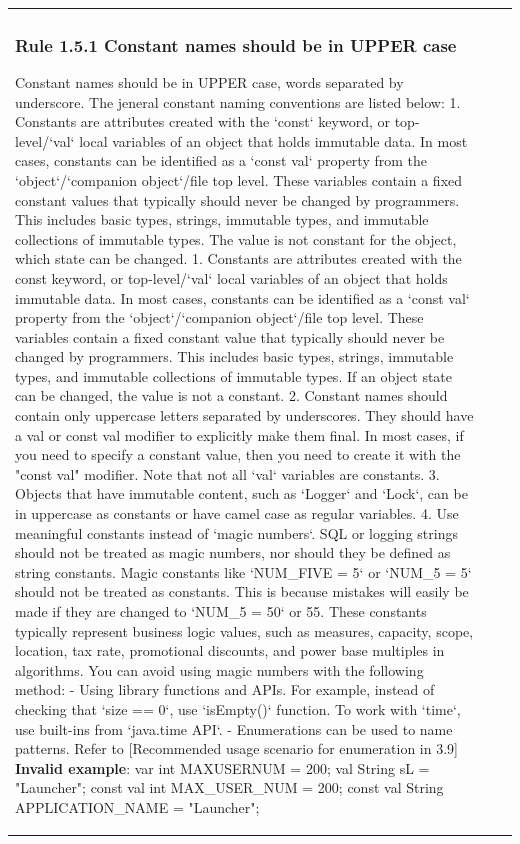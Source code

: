 \begin{center}
\begin{tabular}{ |p{}|p{}|p{}| }
\subsubsection*{\textbf{Rule 1.5.1 Constant names should be in UPPER case}}
Constant names should be in UPPER case, words separated by underscore. The jeneral constant naming conventions are listed below:
1. Constants are attributes created with the `const` keyword, or top-level/`val` local variables of an object that holds immutable data. In most cases, constants can be identified as a `const val` property from the `object`/`companion object`/file top level. These variables contain a fixed constant values that typically should never be changed by programmers. This includes basic types, strings, immutable types, and immutable collections of immutable types. The value is not constant for the object, which state can be changed.
1. Constants are attributes created with the const keyword, or top-level/`val` local variables of an object that holds immutable data. In most cases, constants can be identified as a `const val` property from the `object`/`companion object`/file top level. These variables contain a fixed constant value that typically should never be changed by programmers. This includes basic types, strings, immutable types, and immutable collections of immutable types. If an object state can be changed, the value is not a constant.
2. Constant names should contain only uppercase letters separated by underscores. They should have a val or const val modifier to explicitly make them final. In most cases, if you need to specify a constant value, then you need to create it with the "const val" modifier. Note that not all `val` variables are constants.
3. Objects that have immutable content, such as `Logger` and `Lock`, can be in uppercase as constants or have camel case as regular variables.
4. Use meaningful constants instead of `magic numbers`. SQL or logging strings should not be treated as magic numbers, nor should they be defined as string constants.
Magic constants like `NUM_FIVE = 5` or `NUM_5 = 5` should not be treated as constants. This is because mistakes will easily be made if they are changed to `NUM_5 = 50` or 55.
These constants typically represent business logic values, such as measures, capacity, scope, location, tax rate, promotional discounts, and power base multiples in algorithms.
You can avoid using magic numbers with the following method:
- Using library functions and APIs. For example, instead of checking that `size == 0`, use `isEmpty()` function. To work with `time`, use built-ins from `java.time API`.
- Enumerations can be used to name patterns. Refer to [Recommended usage scenario for enumeration in 3.9]
\textbf{Invalid example}:
var int MAXUSERNUM = 200;
val String sL = "Launcher";
const val int MAX_USER_NUM = 200;
const val String APPLICATION_NAME = "Launcher";

\end{tabular}
\end{center}
